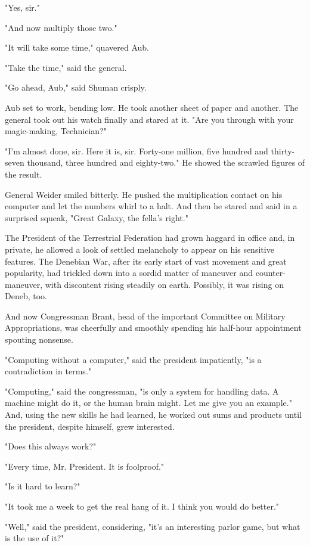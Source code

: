 \documentclass{amsart}
\begin{document}
"Yes, sir."

"And now multiply those two."

"It will take some time," quavered Aub.

"Take the time," said the general.

"Go ahead, Aub," said Shuman crisply.

Aub set to work, bending low. He took another sheet of paper and
another. The general took out his watch finally and stared at it. "Are
you through with your magic-making, Technician?"

"I'm almost done, sir. Here it is, sir. Forty-one million, five
hundred and thirty-seven thousand, three hundred and eighty-two." He
showed the scrawled figures of the result.

General Weider smiled bitterly. He pushed the multiplication contact
on his computer and let the numbers whirl to a halt. And then he
stared and said in a surprised squeak, "Great Galaxy, the fella's
right."

The President of the Terrestrial Federation had grown haggard in
office and, in private, he allowed a look of settled melancholy to
appear on his sensitive features. The Denebian War, after its early
start of vast movement and great popularity, had trickled down into a
sordid matter of maneuver and counter-maneuver, with discontent rising
steadily on earth. Possibly, it was rising on Deneb, too.

And now Congressman Brant, head of the important Committee on Military
Appropriations, was cheerfully and smoothly spending his half-hour
appointment spouting nonsense.

"Computing without a computer," said the president impatiently, "is a
contradiction in terms."

"Computing," said the congressman, "is only a system for handling
data. A machine might do it, or the human brain might. Let me give you
an example." And, using the new skills he had learned, he worked out
sums and products until the president, despite himself, grew
interested.

"Does this always work?"

"Every time, Mr. President. It is foolproof."

"Is it hard to learn?"

"It took me a week to get the real hang of it. I think you would do
better."

"Well," said the president, considering, "it's an interesting parlor
game, but what is the use of it?"
\end{document}

